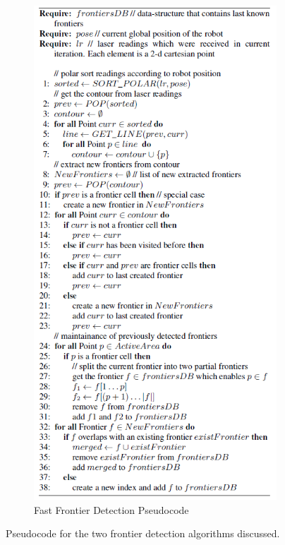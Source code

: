 \documentclass[a4paper,12pt]{article}
\begin{document}
\begin{figure}[H]
\begin{subfigure}{.5\textwidth}
						\includegraphics[width=.9\linewidth]{images/ffdPseudocode.png}
						\caption{Fast Frontier Detection Pseudocode}
						\label{ffdPseudocode}
					\end{subfigure}
					\caption{Pseudocode for the two frontier detection algorithms discussed. \cite{topiwala2018frontier, keidar2011fast}}
					\label{frontierSearchPseudocode}
				\end{figure}
\end{document}
